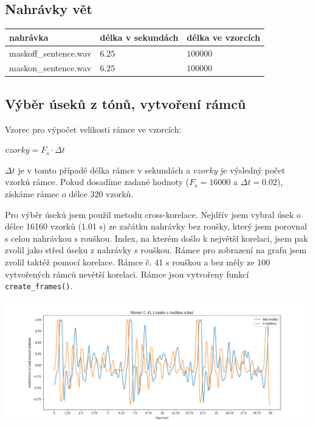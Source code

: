 \documentclass[12pt]{article}
\begin{document}
\subsection{Nahrávky vět}
\begin{center}
\begin{tabular}{| m{} | m{} | m{} |} 
\hline
\textbf{nahrávka} & \textbf{délka v sekundách} & \textbf{délka ve vzorcích}\\
\hline
maskoff\_sentence.wav & $6.25$ & $100000$ \\ 
maskon\_sentence.wav & $6.25$ & $100000$ \\ 
\hline
\end{tabular}
\end{center}
\subsection{Výběr úseků z tónů, vytvoření rámců}
\hspace{1.5em}Vzorec pro výpočet velikosti rámce ve vzorcích:
\begin{center}
$vzorky = F_s \cdot \Delta t$
\end{center}
$\Delta t$ je v tomto případě délka rámce v sekundách a $vzorky$ je výsledný počet vzorků rámce. Pokud dosadíme zadané hodnoty ($F_s = 16000$ a $\Delta t = 0.02$), získáme rámec o délce $320$ vzorků.

\hspace{1.5em}Pro výběr úseků jsem použil metodu cross-korelace. Nejdřív jsem vybral úsek o délce 16160 vzorků (1.01 s) ze začátku nahrávky bez roušky, který jsem porovnal s celou nahrávkou s rouškou. Index, na kterém došlo k největší korelaci, jsem pak zvolil jako střed úseku z nahrávky s rouškou. Rámce pro zobrazení na grafu jsem zvolil taktéž pomocí korelace. Rámce č. 41 s rouškou a bez měly ze 100 vytvořených rámců nevětší korelaci. Rámce jsou vytvořeny funkcí \texttt{create\_frames()}.

\hspace{-4.5em}\includegraphics[scale=0.55]{ukol3.png}
\end{document}

